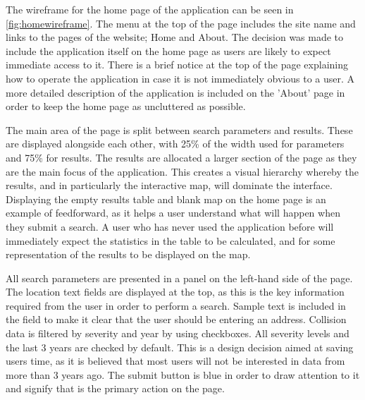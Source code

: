 \documentclass[authoryearcitations]{UoYCSproject}
\begin{document}
The wireframe for the home page of the application can be seen in \autoref{fig:homewireframe}. The menu at the top of the page includes the site name and links to the pages of the website; Home and About. The decision was made to include the application itself on the home page as users are likely to expect immediate access to it. There is a brief notice at the top of the page explaining how to operate the application in case it is not immediately obvious to a user. A more detailed description of the application is included on the 'About' page in order to keep the home page as uncluttered as possible. 

The main area of the page is split between search parameters and results. These are displayed alongside each other, with 25\% of the width used for parameters and 75\% for results. The results are allocated a larger section of the page as they are the main focus of the application. This creates a visual hierarchy whereby the results, and in particularly the interactive map, will dominate the interface. Displaying the empty results table and blank map on the home page is an example of feedforward, as it helps a user understand what will happen when they submit a search. A user who has never used the application before will immediately expect the statistics in the table to be calculated, and for some representation of the results to be displayed on the map. 

All search parameters are presented in a panel on the left-hand side of the page. The location text fields are displayed at the top, as this is the key information required from the user in order to perform a search. Sample text is included in the field to make it clear that the user should be entering an address. Collision data is filtered by severity and year by using checkboxes. All severity levels and the last 3 years are checked by default. This is a design decision aimed at saving users time, as it is believed that most users will not be interested in data from more than 3 years ago. The submit button is blue in order to draw attention to it and signify that is the primary action on the page.
\end{document}
